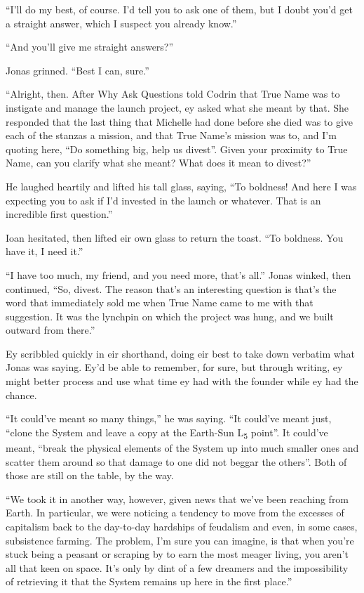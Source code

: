 ``I'll do my best, of course. I'd tell you to ask one of them, but I doubt you'd get a straight answer, which I suspect you already know.''

``And you'll give me straight answers?''

Jonas grinned. ``Best I can, sure.''

``Alright, then. After Why Ask Questions told Codrin that True Name was to instigate and manage the launch project, ey asked what she meant by that. She responded that the last thing that Michelle had done before she died was to give each of the stanzas a mission, and that True Name's mission was to, and I'm quoting here, ``Do something big, help us divest''. Given your proximity to True Name, can you clarify what she meant? What does it mean to divest?''

He laughed heartily and lifted his tall glass, saying, ``To boldness! And here I was expecting you to ask if I'd invested in the launch or whatever. That is an incredible first question.''

Ioan hesitated, then lifted eir own glass to return the toast. ``To boldness. You have it, I need it.''

``I have too much, my friend, and you need more, that's all.'' Jonas winked, then continued, ``So, divest. The reason that's an interesting question is that's the word that immediately sold me when True Name came to me with that suggestion. It was the lynchpin on which the project was hung, and we built outward from there.''

Ey scribbled quickly in eir shorthand, doing eir best to take down verbatim what Jonas was saying. Ey'd be able to remember, for sure, but through writing, ey might better process and use what time ey had with the founder while ey had the chance.

``It could've meant so many things,'' he was saying. ``It could've meant just, ``clone the System and leave a copy at the Earth-Sun L\textsubscript{5} point''. It could've meant, ``break the physical elements of the System up into much smaller ones and scatter them around so that damage to one did not beggar the others''. Both of those are still on the table, by the way.

``We took it in another way, however, given news that we've been reaching from Earth. In particular, we were noticing a tendency to move from the excesses of capitalism back to the day-to-day hardships of feudalism and even, in some cases, subsistence farming. The problem, I'm sure you can imagine, is that when you're stuck being a peasant or scraping by to earn the most meager living, you aren't all that keen on space. It's only by dint of a few dreamers and the impossibility of retrieving it that the System remains up here in the first place.''

